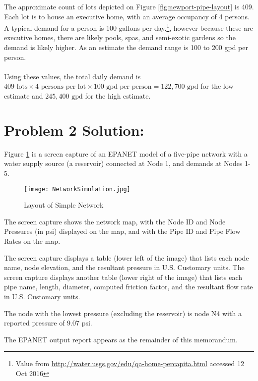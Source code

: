 \documentclass[12pt]{article}
\begin{document}
The approximate count of lots depicted on Figure \ref{fig:newport-pipe-layout} is 409.  
Each lot is to house an executive home, with an average occupancy of 4 persons.  
A typical demand for a person is 100 gallons per day.\footnote{Value from \url{http://water.usgs.gov/edu/qa-home-percapita.html} accessed 12 Oct 2016}, however because these are executive homes, there are likely pools, spas, and semi-exotic gardens so the demand is likely higher.  
As an estimate the demand range is 100 to 200 gpd per person. \\~\\
Using these values, the total daily demand is $409 \text{~lots} \times 4 \text{~persons per lot} \times 100 \text{~gpd per person} = 122,700 \text{~gpd} $ for the low estimate and $ 245,400 \text{~gpd} $ for the high estimate.
\clearpage
\section*{\small{Problem 2 Solution:}}
Figure \ref{fig:NetworkLayout} is a screen capture of an EPANET model of a five-pipe network with a water supply source (a reservoir) connected at Node 1, and demands at Nodes 1-5.

\begin{figure}[h!] %
\centering
   \texttt{[image: NetworkSimulation.jpg]}
   \caption{Layout of Simple Network}
   \label{fig:NetworkLayout} 
\end{figure}

The screen capture shows the network map, with the Node ID and Node Pressures (in psi) displayed on the map, and with the Pipe ID and Pipe Flow Rates on the map.

The screen capture displays a table (lower left of the image) that lists each node name, node elevation, and the resultant pressure in U.S. Customary units.  The screen capture displays another table (lower right of the image) that lists each pipe name, length, diameter, computed friction factor, and the resultant flow rate in U.S. Customary units.  

The node with the lowest pressure (excluding the reservoir) is node N4 with a reported pressure of 9.07 psi.

The EPANET output report appears as the remainder of this memorandum.
\end{document}
